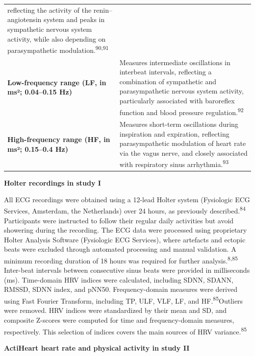 \documentclass[
  a4paper,
  headsepline=true,
  open=left]{scrbook}
\begin{document}
\begin{longtable}[]{@{}
  >{\raggedright\arraybackslash}p{}
  >{\raggedright\arraybackslash}p{}@{}}
reflecting the activity of the renin--angiotensin system and peaks in
sympathetic nervous system activity, while also depending on
parasympathetic modulation.\textsuperscript{90,91} \\
\textbf{Low-frequency range (LF, in ms²; 0.04--0.15 Hz)} & Measures
intermediate oscillations in interbeat intervals, reflecting a
combination of sympathetic and parasympathetic nervous system activity,
particularly associated with baroreflex function and blood pressure
regulation.\textsuperscript{92} \\
\textbf{High-frequency range (HF, in ms²; 0.15--0.4 Hz)} & Measures
short-term oscillations during inspiration and expiration, reflecting
parasympathetic modulation of heart rate via the vagus nerve, and
closely associated with respiratory sinus
arrhythmia.\textsuperscript{93} \\
\end{longtable}

\textbf{Holter recordings in study I}

All ECG recordings were obtained using a 12-lead Holter system
(Fysiologic ECG Services, Amsterdam, the Netherlands) over 24 hours, as
previously described.\textsuperscript{84} Participants were instructed
to follow their regular daily activities but avoid showering during the
recording. The ECG data were processed using proprietary Holter Analysis
Software (Fysiologic ECG Services), where artefacts and ectopic beats
were excluded through automated processing and manual validation. A
minimum recording duration of 18 hours was required for further
analysis.\textsuperscript{8,85} Inter-beat intervals between consecutive
sinus beats were provided in milliseconds (ms). Time-domain HRV indices
were calculated, including SDNN, SDANN, RMSSD, SDNN index, and pNN50.
Frequency-domain measures were derived using Fast Fourier Transform,
including TP, ULF, VLF, LF, and HF.\textsuperscript{85}Outliers were
removed. HRV indices were standardized by their mean and SD, and
composite Z-scores were computed for time and frequency-domain measures,
respectively. This selection of indices covers the main sources of HRV
variance.\textsuperscript{85}

\textbf{ActiHeart heart rate and physical activity in study II}
\end{document}
